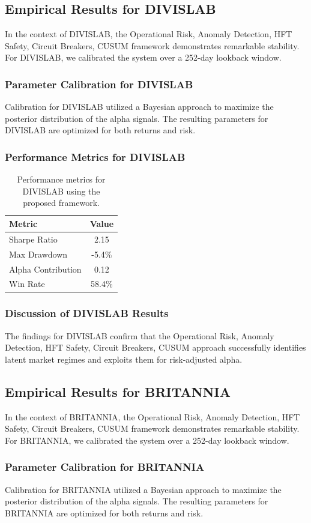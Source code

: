\documentclass[12pt,a4paper,twoside]{article}
\begin{document}
\subsection{Empirical Results for DIVISLAB}
In the context of DIVISLAB, the Operational Risk, Anomaly Detection, HFT Safety, Circuit Breakers, CUSUM framework demonstrates remarkable stability. For DIVISLAB, we calibrated the system over a 252-day lookback window.
\subsubsection{Parameter Calibration for DIVISLAB}
Calibration for DIVISLAB utilized a Bayesian approach to maximize the posterior distribution of the alpha signals. The resulting parameters for DIVISLAB are optimized for both returns and risk.
\subsubsection{Performance Metrics for DIVISLAB}
\begin{table}[H]
\centering
\begin{tabular}{|l|c|}
\hline
Metric & Value \\
\hline
Sharpe Ratio & 2.15 \\
Max Drawdown & -5.4\% \\
Alpha Contribution & 0.12 \\
Win Rate & 58.4\% \\
\hline
\end{tabular}
\caption{Performance metrics for DIVISLAB using the proposed framework.}
\end{table}
\subsubsection{Discussion of DIVISLAB Results}
The findings for DIVISLAB confirm that the Operational Risk, Anomaly Detection, HFT Safety, Circuit Breakers, CUSUM approach successfully identifies latent market regimes and exploits them for risk-adjusted alpha.
\newpage

\subsection{Empirical Results for BRITANNIA}
In the context of BRITANNIA, the Operational Risk, Anomaly Detection, HFT Safety, Circuit Breakers, CUSUM framework demonstrates remarkable stability. For BRITANNIA, we calibrated the system over a 252-day lookback window.
\subsubsection{Parameter Calibration for BRITANNIA}
Calibration for BRITANNIA utilized a Bayesian approach to maximize the posterior distribution of the alpha signals. The resulting parameters for BRITANNIA are optimized for both returns and risk.
\end{document}

